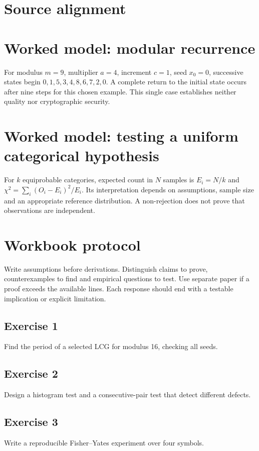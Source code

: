 \documentclass[11pt,letterpaper]{article}
\begin{document}
\tableofcontents
\clearpage
{}
\section{Source alignment}

\section{Worked model: modular recurrence}
For modulus $m=9$, multiplier $a=4$, increment $c=1$, seed $x_0=0$, successive states begin $0,1,5,3,4,8,6,7,2,0$. A complete return to the initial state occurs after nine steps for this chosen example. This single case establishes neither quality nor cryptographic security.
\section{Worked model: testing a uniform categorical hypothesis}
For $k$ equiprobable categories, expected count in $N$ samples is $E_i=N/k$ and $\chi^2=\sum_i(O_i-E_i)^2/E_i$. Its interpretation depends on assumptions, sample size and an appropriate reference distribution. A non-rejection does not prove that observations are independent.

\section{Workbook protocol}
Write assumptions before derivations. Distinguish claims to prove, counterexamples to find and empirical questions to test. Use separate paper if a proof exceeds the available lines. Each response should end with a testable implication or explicit limitation.

\subsection{Exercise 1}\noindent Find the period of a selected LCG for modulus 16, checking all seeds.
\subsection{Exercise 2}\noindent Design a histogram test and a consecutive-pair test that detect different defects.
\subsection{Exercise 3}\noindent Write a reproducible Fisher--Yates experiment over four symbols.
\end{document}
